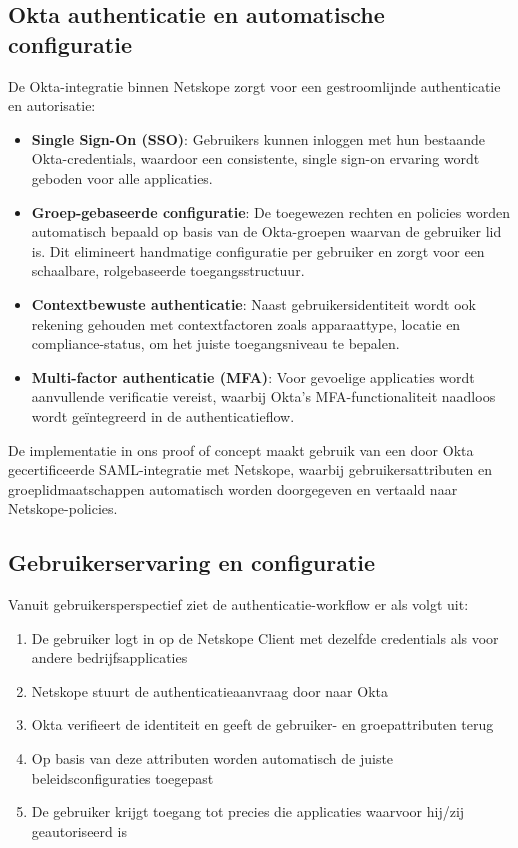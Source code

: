 \subsection{Okta authenticatie en automatische configuratie}

De Okta-integratie binnen Netskope zorgt voor een gestroomlijnde authenticatie en autorisatie:

\begin{itemize}
    \item \textbf{Single Sign-On (SSO)}: Gebruikers kunnen inloggen met hun bestaande Okta-credentials, waardoor een consistente, single sign-on ervaring wordt geboden voor alle applicaties.

    \item \textbf{Groep-gebaseerde configuratie}: De toegewezen rechten en policies worden automatisch bepaald op basis van de Okta-groepen waarvan de gebruiker lid is. Dit elimineert handmatige configuratie per gebruiker en zorgt voor een schaalbare, rolgebaseerde toegangsstructuur.

    \item \textbf{Contextbewuste authenticatie}: Naast gebruikersidentiteit wordt ook rekening gehouden met contextfactoren zoals apparaattype, locatie en compliance-status, om het juiste toegangsniveau te bepalen.

    \item \textbf{Multi-factor authenticatie (MFA)}: Voor gevoelige applicaties wordt aanvullende verificatie vereist, waarbij Okta's MFA-functionaliteit naadloos wordt geïntegreerd in de authenticatieflow.
\end{itemize}

De implementatie in ons proof of concept maakt gebruik van een door Okta gecertificeerde SAML-integratie met Netskope, waarbij gebruikersattributen en groeplidmaatschappen automatisch worden doorgegeven en vertaald naar Netskope-policies.

\subsection{Gebruikerservaring en configuratie}

Vanuit gebruikersperspectief ziet de authenticatie-workflow er als volgt uit:

\begin{enumerate}
    \item De gebruiker logt in op de Netskope Client met dezelfde credentials als voor andere bedrijfsapplicaties
    \item Netskope stuurt de authenticatieaanvraag door naar Okta
    \item Okta verifieert de identiteit en geeft de gebruiker- en groepattributen terug
    \item Op basis van deze attributen worden automatisch de juiste beleidsconfiguraties toegepast
    \item De gebruiker krijgt toegang tot precies die applicaties waarvoor hij/zij geautoriseerd is
\end{enumerate}


